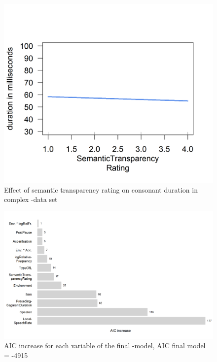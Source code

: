  

 
\begin{figure}
	 
	\includegraphics [scale=0.5] {images/Experiment/LyModelRating}
	\caption{Effect of semantic transparency rating on consonant duration in complex -data set}
	\label{fig: Rating  lyComplex experiment}

\end{figure}





\begin{figure}
	
		
	\includegraphics[scale=0.7]{images/Experiment/AICdecreaseLYComplex.png}
	\caption{AIC increase for each variable of the final -model, AIC final model = -4915}
	\label{fig:Effect sozed ly compl Exp}

\end{figure}


